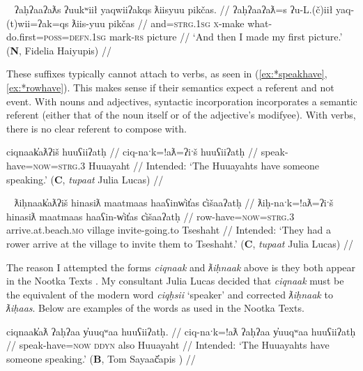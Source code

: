 \begin{comment}
\ex \label{ex:mightnotgive}
\begingl
\glpreamble wikcumʔick huʔayi siičił waaʔaƛ. //
\gla wik-cum=ʔick huʔa-ayiˑ si-L.(č)ił waa=!aƛ //
\glb \textsc{neg}-might=\textsc{real.2sg} back-give \textsc{1sg}-\textsc{do.to} say=\textsc{now} //
\glft ` ``You might not give it back," he said.' (\textbf{C}, \textit{tupaat} Julia Lucas) //
\endgl
\xe
\end{comment}

\ex~ \label{ex:mightnotgive}
\begingl
\glpreamble ʔaḥʔaaʔaƛs ʔuukʷiił yaqwiiʔakqs ƛiisyuu pikčas. //
\gla ʔaḥʔaaʔaƛ=s ʔu-L.(č)iił yaq-(t)wii=ʔak=qs ƛiis-yuu pikčas //
\glb and=\textsc{strg.1sg} \textsc{x}-make what-do.first=\textsc{poss}=\textsc{defn.1sg} mark-\textsc{rs} picture //
\glft `And then I made my first picture.' (\textbf{N}, Fidelia Haiyupis) //
\endgl
\xe

These suffixes typically cannot attach to verbs, as seen in (\ref{ex:*speakhave},\ref{ex:*rowhave}). This makes sense if their semantics expect a referent and not event. With nouns and adjectives, syntactic incorporation incorporates a semantic referent (either that of the noun itself or of the adjective's modifyee). With verbs, there is no clear referent to compose with.

\ex \label{ex:*speakhave}
\begingl
\glpreamble *ciqnaak̓aƛʔiš huuʕiiʔatḥ //
\gla ciq-naˑk=!aƛ=ʔiˑš huuʕiiʔatḥ //
\glb speak-have=\textsc{now}=\textsc{strg.3} Huuayaht //
\glft Intended: `The Huuayahts have someone speaking.' (\textbf{C}, \textit{tupaat} Julia Lucas) //
\endgl
\xe

\ex~ \label{ex:*rowhave}
\begingl
\glpreamble *ƛiḥnaak̓aƛʔiš hinasiƛ maatmaas haaʕinw̓it̓as c̓išaaʔatḥ //
\gla ƛiḥ-naˑk=!aƛ=ʔiˑš hinasiƛ maatmaas haaʕin-w̓it̓as c̓išaaʔatḥ //
\glb row-have=\textsc{now}=\textsc{strg.3} arrive.at.beach.\textsc{mo} village invite-going.to Tseshaht //
\glft Intended: `They had a rower arrive at the village to invite them to Tseshaht.' (\textbf{C}, \textit{tupaat} Julia Lucas) //
\endgl
\xe

The reason I attempted the forms \textit{ciqnaak} and \textit{ƛiḥnaak} above is they both appear in the Nootka Texts \citep{sapir1939, sapir1955}. My consultant Julia Lucas decided that \textit{ciqnaak} must be the equivalent of the modern word \textit{ciqḥsii} `speaker' and corrected \textit{ƛiḥnaak} to \textit{ƛiḥaas}. Below are examples of the words as used in the Nootka Texts.

\ex \label{ex:speakhave}
\begingl
\glpreamble ciqnaak̓aƛ ʔaḥʔaa y̓uuqʷaa huuʕiiʔatḥ. //
\gla ciq-naˑk=!aƛ ʔaḥʔaa y̓uuqʷaa huuʕiiʔatḥ //
\glb speak-have=\textsc{now} \textsc{ddyn} also Huuayaht //
\glft Intended: `The Huuayahts have someone speaking.' (\textbf{B}, Tom Sayaač̓apis \citealt[169]{sapir1955}) //
\endgl
\xe


